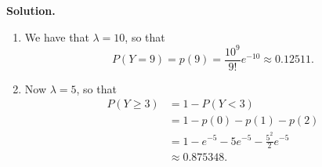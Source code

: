 \documentclass[9pt]{article}
\begin{document}
\begin{enumerate}
      \textbf{Solution.}

      \begin{enumerate}
         \item We have that $\lambda = 10$, so that
               $$P(Y = 9) = p(9) = \frac{10^9}{9!}e^{-10} \approx 0.12511.$$
         \item Now $\lambda = 5$, so that
               \begin{align*}
                  P(Y \ge 3) &= 1 - P(Y < 3) \\
                             &= 1 - p(0) - p(1) - p(2) \\
                             &= 1 - e^{-5} - 5e^{-5} - \frac{5^2}{2}e^{-5} \\
                             &\approx 0.875348.
               \end{align*} 
      \end{enumerate}
\end{enumerate}
\end{document}
